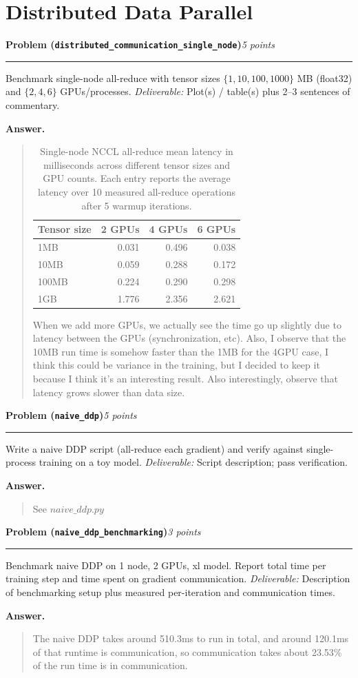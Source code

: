 \documentclass[11pt]{article}
\newcommand{\problem}[2]{%
  \vspace{0.6em}%
  \noindent\textbf{Problem (\texttt{#1})}\hfill\textit{#2 points}\par%
  \vspace{0.2em}\hrule\vspace{0.4em}%
}
\newcommand{\deliverable}[1]{\vspace{0.2em}\noindent\textit{Deliverable:} #1\par}
\newenvironment{answer}{%
  \vspace{0.3em}%
  \noindent\textbf{Answer.}\begin{quote}%
}{%
  \end{quote}\vspace{0.4em}%
}
\begin{document}
\section{Distributed Data Parallel}

\problem{distributed\_communication\_single\_node}{5}
Benchmark single-node all-reduce with tensor sizes $\{1, 10, 100, 1000\}$ MB (float32) and $\{2, 4, 6\}$ GPUs/processes.
\deliverable{Plot(s) / table(s) plus 2--3 sentences of commentary.}
\begin{answer}
  \begin{table}[H]
    \centering
    \begin{tabular}{lrrr}
    \toprule
    Tensor size & 2 GPUs & 4 GPUs & 6 GPUs \\
    \midrule
    1MB   & 0.031 & 0.496 & 0.038 \\
    10MB  & 0.059 & 0.288 & 0.172 \\
    100MB & 0.224 & 0.290 & 0.298 \\
    1GB   & 1.776 & 2.356 & 2.621 \\
    \bottomrule
    \end{tabular}
    \caption{Single-node NCCL all-reduce mean latency in milliseconds across different tensor sizes and GPU counts. Each entry reports the average latency over 10 measured all-reduce operations after 5 warmup iterations.}
    \label{tab:ddp_allreduce_latency}
    \end{table}
  When we add more GPUs, we actually see the time go up slightly due to latency between the GPUs (synchronization, etc). 
  Also, I observe that the 10MB run time is somehow faster than the 1MB for the 4GPU case, I think this could be variance in the 
  training, but I decided to keep it because I think it's an interesting result. Also interestingly, observe that 
  latency grows slower than data size.
\end{answer}


\problem{naive\_ddp}{5}
Write a naive DDP script (all-reduce each gradient) and verify against single-process training on a toy model.
\deliverable{Script description; pass verification.}
\begin{answer}
  See $naive\_ddp.py$
\end{answer}


\problem{naive\_ddp\_benchmarking}{3}
Benchmark naive DDP on 1 node, 2 GPUs, xl model. Report total time per training step and time spent on gradient communication.
\deliverable{Description of benchmarking setup plus measured per-iteration and communication times.}
\begin{answer}
The naive DDP takes around 510.3ms to run in total, and around 120.1ms of that runtime is communication, so communication takes 
about 23.53\% of the run time is in communication. 
\end{answer}
\end{document}
